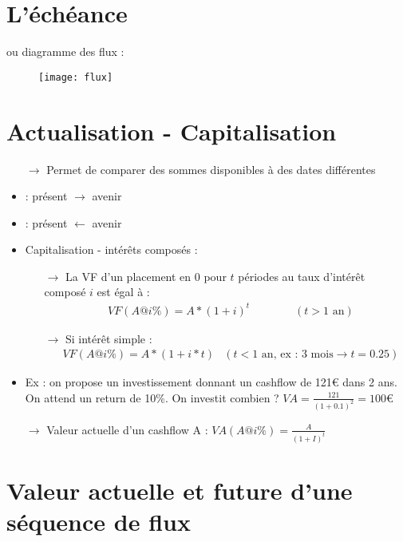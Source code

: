 \section{L'échéance}

ou diagramme des flux :
\begin{figure}[H]
    \centering
    \texttt{[image: flux]}
\end{figure}

\section{Actualisation - Capitalisation}

\begin{itemize}
    \item[$\rightarrow$] Permet de comparer des sommes disponibles à des dates différentes
    \item {} : présent $\rightarrow$ avenir
    \item {} : présent $\leftarrow$ avenir
    \item Capitalisation - intérêts composés :
    \begin{itemize}
        \item[$\rightarrow$] La VF d'un placement en $0$ pour $t$ périodes au taux d'intérêt composé $i$ est égal à :
        \begin{align*}
            &VF(A@i\%) = A * (1 + i)^t &&&&& (t > 1 \text{ an})
        \end{align*}
    \end{itemize}
    \begin{itemize}
        \item[$\rightarrow$] Si intérêt simple :
        \begin{align*}
            &VF(A@i\%) = A * (1 + i * t) & (t < 1 \text{ an, ex : 3 mois}\rightarrow t = 0.25)
        \end{align*}
    \end{itemize}
    \item Ex : on propose un investissement donnant un cashflow de 121€ dans 2 ans. On attend un return de 10\%. On investit combien ? $VA = \frac{121}{(1 + 0.1)^2} = 100$€
    \item[$\rightarrow$] Valeur actuelle d'un cashflow A : $VA (A@i\%) = \frac{A}{(1 + I)^t}$
\end{itemize}

\section{Valeur actuelle et future d'une séquence de flux}

